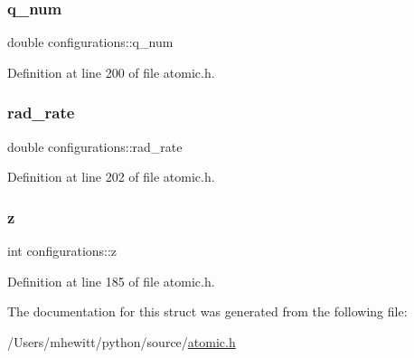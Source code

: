 \subsubsection{\texorpdfstring{q\+\_\+num}{q\_num}}
{\footnotesize\ttfamily double configurations\+::q\+\_\+num}



Definition at line 200 of file atomic.\+h.

\mbox{\label{structconfigurations_abf1125a802f1740cae3bf0ed4b553601}} 
\subsubsection{\texorpdfstring{rad\+\_\+rate}{rad\_rate}}
{\footnotesize\ttfamily double configurations\+::rad\+\_\+rate}



Definition at line 202 of file atomic.\+h.

\mbox{\label{structconfigurations_ae97a36c9d803a4a888b73f5c9d589889}} 
\subsubsection{\texorpdfstring{z}{z}}
{\footnotesize\ttfamily int configurations\+::z}



Definition at line 185 of file atomic.\+h.



The documentation for this struct was generated from the following file\+:\begin{DoxyCompactItemize}
\item 
/\+Users/mhewitt/python/source/\hyperlink{atomic_8h}{atomic.\+h}\end{DoxyCompactItemize}
